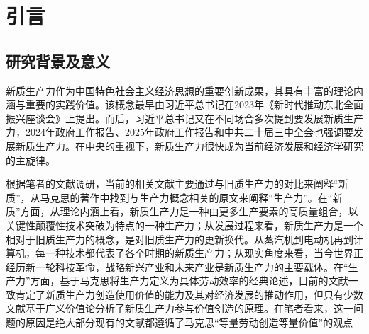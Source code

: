 
\chapter{引言}

\section{研究背景及意义}

新质生产力作为中国特色社会主义经济思想的重要创新成果，其具有丰富的理论内涵与重要的实践价值。该概念最早由习近平总书记在2023年《新时代推动东北全面振兴座谈会》上提出\cite{YinBoGuLaoLaoBaWoDongBeiDeChongYaoShiMingFenLiPuXieDongBeiQuanMianZhenXingXinPianZhang2023}。而后，习近平总书记又在不同场合多次提到要发展新质生产力，2024年政府工作报告\cite[17]{LiQiangZhengFuGongZuoBaoGao2024Nian3Yue5RiZaiDiShiSiJieQuanGuoRenMinDaiBiaoDaHuiDiErCiHuiYiShang2024}、2025年政府工作报告\cite[19]{LiQiangZhengFuGongZuoBaoGao2025Nian3Yue5RiZaiDiShiSiJieQuanGuoRenMinDaiBiaoDaHuiDiSanCiHuiYiShang2025}和中共二十届三中全会\cite[8]{ZhongGuoGongChanDangDiErShiJieZhongYangWeiYuanHuiDiSanCiQuanTiHuiYiGongBao2024}也强调要发展新质生产力。在中央的重视下，新质生产力很快成为当前经济发展和经济学研究的主旋律。

根据笔者的文献调研，当前的相关文献主要通过与旧质生产力的对比来阐释“新质”，从马克思的著作中找到与生产力概念相关的原文来阐释“生产力”。在“新质”方面，从理论内涵上看，新质生产力是一种由更多生产要素的高质量组合，以关键性颠覆性技术突破为特点的一种生产力\cite[141-142]{GaoFanXinZhiShengChanLiDeTiChuLuoJiDuoWeiNeiHanJiShiDaiYiYi2023}\cite[1-2]{ZhouWenLunXinZhiShengChanLiNeiHanTeZhengYuChongYaoZhaoLiDian2023}；从发展过程来看，新质生产力是一个相对于旧质生产力的概念，是对旧质生产力的更新换代。从蒸汽机到电动机再到计算机，每一种技术都代表了各个时期的新质生产力\cite[28]{CaiJiMingXinZhiShengChanLiDeFaZhanDuiJieZhiChuangZaoHeJingJiZengChangDeGongXian2024}；从现实角度来看，当今世界正经历新一轮科技革命\cite[06]{XiJinPingJiaKuaiJianSheKeJiQiangGuoShiXianGaoShuiPingKeJiZiLiZiQiang2022}，战略新兴产业和未来产业是新质生产力的主要载体\cite[9]{XiJinPingJingJiSiXiangYanJiuZhongXinXinZhiShengChanLiDeNeiHanTeZhengHeFaZhanChongDian2024}。在“生产力”方面，基于马克思将生产力定义为具体劳动效率的经典论述\cite[59]{ZhongGongZhongYangMaKeSiEnGeSiLieNingSiDaLinZhuZuoBianYiJuMaKeSiEnGeSiWenJiDi5Juan2009}，目前的文献一致肯定了新质生产力创造使用价值的能力及其对经济发展的推动作用\cite[16]{CaiJiMingXinZhiShengChanLiCanYuJieZhiChuangZaoDeLiLunTanTaoHeShiJianYingYong2024}\cite{YangYuZhenXinZhiShengChanLiLiLunDuiMaKeSiShengChanLiShengChanGuanXiLiLunDeShouZhengHeChuangXin2025}\cite{XieFuShengMaKeSiDeShengChanLiLiLunYuFaZhanXinZhiShengChanLi2024}\cite{HuYingZaiLunXinZhiShengChanLiDeNeiHanTeZhengYuXingChengLuJingYiMaKeSiShengChanLiLiLunWeiShiJiao2024}，但只有少数文献基于广义价值论分析了新质生产力参与价值创造的原理\cite{CaiJiMingXinZhiShengChanLiDeFaZhanDuiJieZhiChuangZaoHeJingJiZengChangDeGongXian2024}\cite{CaiJiMingXinZhiShengChanLiCanYuJieZhiChuangZaoDeLiLunTanTaoHeShiJianYingYong2024}。在笔者看来，这一问题的原因是绝大部分现有的文献都遵循了马克思“等量劳动创造等量价值”的观点\cite[60]{ZhongGongZhongYangMaKeSiEnGeSiLieNingSiDaLinZhuZuoBianYiJuMaKeSiEnGeSiWenJiDi5Juan2009}

